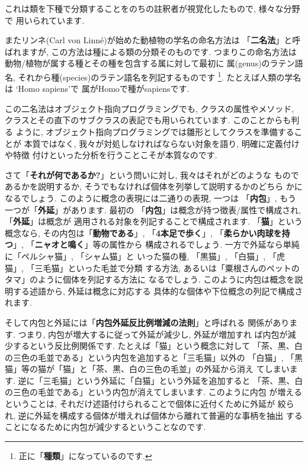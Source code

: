 \documentclass[b5j,8pt,twocolumn]{ltjsarticle}
\begin{document}
これは類を下種で分類することをのちの註釈者が視覚化したもので, 様々な分野で
用いられています.
\newline

またリンネ(Carl von Linn\'e)が始めた動植物の学名の命名方法は
「\textbf{二名法}」と呼ばれますが, この方法は種による類の分類そのものです.
 つまりこの命名方法は動物/植物が属する種とその種を包含する属に対して最初に
属(genus)のラテン語名, それから種(species)のラテン語名を列記するものです
\footnote{正に「\textbf{種類}」になっているのです.}. たとえば人類の学名は
`Homo sapiens'で 属がHomoで種がsapiensです.
\newline

この二名法はオブジェクト指向プログラミングでも, クラスの属性やメソッド,
クラスとその直下のサブクラスの表記でも用いられています. このことからも判る
ように, オブジェクト指向プログラミングでは雛形としてクラスを準備することが
本質ではなく, 我々が対処しなければならない対象を語り, 明確に定義付けや特徴
付けといった分析を行うことこそが本質なのです.
\newline


さて「\textbf{それが何であるか?}」という問いに対し, 我々はそれがどのような
ものであるかを説明するか, そうでもなければ個体を列挙して説明するかのどちら
かになるでしょう. このように概念の表現には二通りの表現, 一つは
「\textbf{内包}」, もう一つが「\textbf{外延}」があります. 最初の
「\textbf{内包}」は概念が持つ徴表/属性で構成され,「\textbf{外延}」は概念が
適用される対象を列記することで構成されます. 「\textbf{猫}」という概念なら,
 その内包は「\textbf{動物である}」, 「\textbf{4本足で歩く}」,
 「\textbf{柔らかい肉球を持つ}」, 「\textbf{ニャオと鳴く}」等の属性から
構成されるでしょう. 一方で外延なら単純に「ペルシャ猫」, 「シャム猫」と
いった猫の種, 「黒猫」, 「白猫」, 「虎猫」, 「三毛猫」といった毛並で分類
する方法, あるいは「粟根さんのペットのタマ」のように個体を列記する方法に
なるでしょう. このように内包は概念を説明する述語から, 外延は概念に対応する
具体的な個体や下位概念の列記で構成されます.
\newline


そして内包と外延には「\textbf{内包外延反比例増減の法則}」と呼ばれる
関係があります. つまり, 内包が増大するに従って外延が減少し, 外延が増加すれ
ば内包が減少するという反比例関係です. たとえば「猫」という概念に対して
「茶、黒、白の三色の毛並である」という内包を追加すると「三毛猫」以外の
「白猫」, 「黒猫」等の猫が「猫」と「茶、黒、白の三色の毛並」の外延から消え
てしまいます. 逆に「三毛猫」という外延に「白猫」という外延を追加すると
「茶、黒、白の三色の毛並である」という内包が消えてしまいます. このように内包
が増えるということは, それだけ述語付けられることで個体に近付くために外延が
絞られ, 逆に外延を構成する個体が増えれば個体から離れて普遍的な事柄を抽出
することになるために内包が減少するということなのです.
\newline
\end{document}
